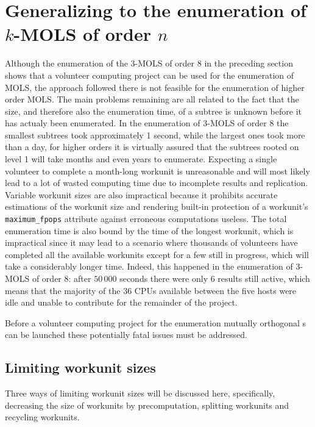 \section{Generalizing to the enumeration of $k$-MOLS of order $n$}\label{5gen}
Although the enumeration of the 3-MOLS of order 8 in the preceding section shows that a volunteer computing project can be used for the enumeration of MOLS, the approach followed there is not feasible for the enumeration of higher order MOLS. The   main problems remaining are all related to the fact that the size, and therefore also the enumeration time, of a subtree is unknown before it has actualy been enumerated. In the enumeration of 3-MOLS of order 8 the smallest subtrees took approximately 1 second, while the largest ones took more than a day, for higher orders it is virtually assured that the subtrees rooted on level 1 will take months and even years to enumerate. Expecting a single volunteer to complete a month-long workunit is unreasonable and will most likely lead to a lot of wasted computing time due to   incomplete results and replication. Variable workunit sizes are also impractical because it prohibits accurate estimations of the workunit size and rendering   built-in protection of a workunit's \verb|maximum_fpops| attribute against erroneous computations useless. The total enumeration time is also bound by the time of the longest workunit, which is impractical since it may lead to a scenario where thousands of volunteers have completed all the available workunits except for a few still in progress, which will take a considerably longer time. Indeed, this happened in the enumeration of 3-MOLS of order 8: after $50\,000$ seconds there were only 6 results still active, which means that the majority of the 36 CPUs available between the five hosts were idle and unable to contribute for the remainder of the project. 

Before a volunteer computing project for the enumeration mutually orthogonal \lat s can be launched these potentially fatal issues must be addressed.

\subsection{Limiting workunit sizes} \label{5gensizes}
Three ways of limiting workunit sizes   will be discussed here, specifically,  decreasing the size of workunits by precomputation, splitting workunits and recycling workunits.

